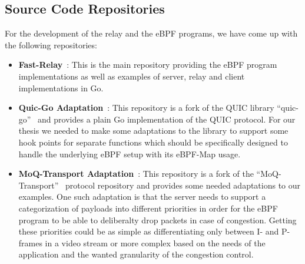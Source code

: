 \subsection{Source Code Repositories}\label{sec:source_code_repos}
For the development of the relay and the eBPF programs, we have come up with the following repositories:
\begin{itemize}

    \item \textbf{Fast-Relay}~\parencite{adaptive-moq-repo}:
    This is the main repository providing the eBPF program implementations as well as examples of 
    server, relay and client implementations in Go.
    
    \item \textbf{Quic-Go Adaptation}~\parencite{quic-go-prio-packs-repo}:
    This repository is a fork of the QUIC library ``quic-go''~\parencite{quic-go-repo} and provides a 
    plain Go implementation of the QUIC protocol.
    For our thesis we needed to make some adaptations to the library to support some hook points for 
    separate functions which should be specifically designed to handle the underlying eBPF setup with its eBPF-Map usage. 
    
    \item \textbf{MoQ-Transport Adaptation}~\parencite{priority-moqtransport-repo}:
    This repository is a fork of the ``MoQ-Transport''~\parencite{draft-moqtransport} protocol repository and provides
    some needed adaptations to our examples. One such adaptation is that the server needs to support a 
    categorization of payloads into different priorities in order for the eBPF program to be able to 
    deliberalty drop packets in case of congestion.
    Getting these priorities could be as simple as differentiating only between I- and P-frames in a video 
    stream or more complex based on the needs of the application and the wanted granularity of the congestion 
    control.
    
\end{itemize}